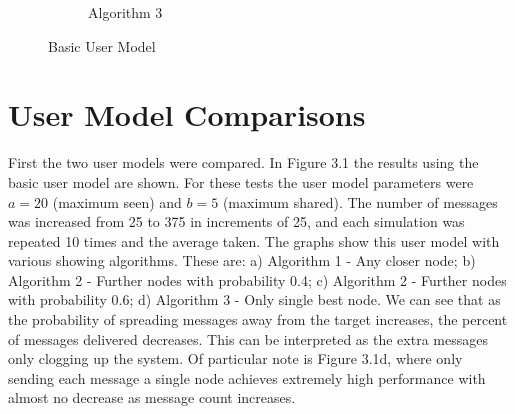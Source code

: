 \documentclass[bsc,frontabs,twoside,singlespacing,parskip,deptreport]{infthesis}     %
\begin{document}
\begin{figure}
\begin{subfigure}[b]{0.3\textwidth}
        \caption{Algorithm 3}
        \label{fig:results/BasicShare_OnlyBest}
    \end{subfigure}
  	\vspace{-5pt}
    \caption{Basic User Model}\label{fig:BasicUserModel}
  	\vspace{-15pt}
\end{figure}

\section{User Model Comparisons}
First the two user models were compared. In Figure 3.1 the results using the basic user model are shown. For these tests the user model parameters were $a = 20$ (maximum seen) and $b = 5$ (maximum shared). The number of messages was increased from 25 to 375 in increments of 25, and each simulation was repeated 10 times and the average taken. The graphs show this user model with various showing algorithms. These are: a) Algorithm 1 - Any closer node; b) Algorithm 2 - Further nodes with probability 0.4; c) Algorithm 2 - Further nodes with probability 0.6; d) Algorithm 3 - Only single best node. We can see that as the probability of spreading messages away from the target increases, the percent of messages delivered decreases. This can be interpreted as the extra messages only clogging up the system. Of particular note is Figure 3.1d, where only sending each message a single node achieves extremely high performance with almost no decrease as message count increases.
\end{document}
